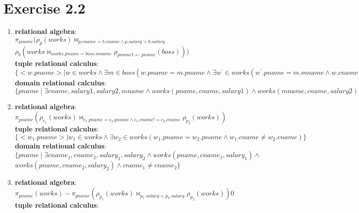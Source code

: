 \documentclass[12pt]{article}
\begin{document}
	\section{Exercise 2.2}
	\begin{enumerate}[label = 2.2.\arabic*]
		\item %
			\textbf{relational algebra}: \\
			$\pi_{pname}( \rho_{p}(works) \bowtie_{p.cname = b.cname \land p.salary > b.salary}$ \\
			\hspace*{2cm}$ \rho_{b}(works \bowtie_{works.pname = boss.mname} \rho_{pname1\leftarrow pname}(boss) ) )$ \\
			\textbf{tuple relational calculus}:\\
			$\{ <w.pname> \mid w \in works \land \exists m \in boss (w.pname = m.pname \land \exists w^\prime \in works ( w^\prime.pname =m.mname \land w.cname = w^\prime.cname \land w.salary > w^\prime.salary ))  \}$ \\
			\textbf{domain relational calculus}: \\
			$\{ pname \mid \exists cname, salary1, salary2,mname \land works(pname,cname,salary1) \land works(mname, cname, salary2) \land boss(pname, cname) \land salary1 > salary2\}$
		\item 
			\textbf{relational algebra}:\\
			$\pi_{pname}( \rho_{c_1}(works) \bowtie_{c_1.pname=c_2.pname \land c_1.cname != c_2.cname} \rho_{p_2}(works) )$ \\
			\textbf{tuple relational calculus}:\\
			$\{ <w_1.pname> \mid w_1\in works \land \exists w_2 \in works( w_1.pname=w_2.pname \land w_1.cname \neq w_2.cname) \} $ \\
			\textbf{domain relational calculus}:\\
			$\{ pname \mid \exists cname_1, cname_2, salary_1, salary_2 \land works(pname, cname_1, salary_1) \land$ \\
			\hspace*{2cm}$ works(pname, cname_2, salary_2) \land cname_1 \neq cname_2 \} $ \\
		\item 
			\textbf{relational algebra}:\\
			$\pi_{pname}(works) - \pi_{pname}(\rho_{p_1}(works) \bowtie_{p_1.salary < p_2.salary} \rho_{p_2}(works))0$ \\
			\textbf{tuple relational calculus}:\\

\end{enumerate}
\end{document}
